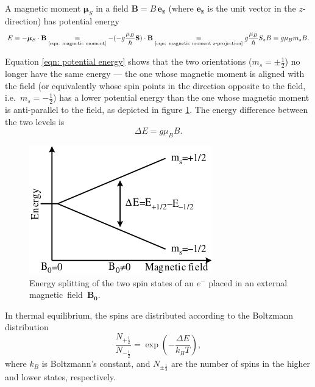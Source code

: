 \documentclass[a4paper]{jpconf}
\numberwithin{equation}{section}
\begin{document}
A magnetic moment $\bm{\mu}_S$ in a field $\mathbf{B} = B \, \mathbf{e_z}$ (where $\mathbf{e_z}$ is the unit vector in the $z$-direction) has potential energy
\begin{equation}
	E = - \bm{\mu}_S \cdot \mathbf{B} \underset{\text{\eqref{eqn: magnetic moment}}}{=}  - (- g \frac{\mu_B}{\hbar} \mathbf{S})\cdot\mathbf{B}
	  \underset{\text{\eqref{eqn: magnetic moment z-projection}}}{=} g \frac{\mu_B}{\hbar}S_z B 
	  = g\mu_Bm_sB \label{eqn: potential energy}.
\end{equation}

Equation \eqref{eqn: potential energy} shows that the two orientations ($m_s = \pm\tfrac12$) no longer have the same energy --- the one whose magnetic moment is aligned with the field (or equivalently whose spin points in the direction opposite to the field, i.e.\ $m_s = -\tfrac12$) has a lower potential energy than the one whose magnetic moment is anti-parallel to the field, as depicted in figure \ref{fig: energy splitting}. The energy difference between the two levels is 
\begin{equation}
	\Delta E = g \mu_B B. \label{eqn: energy difference}
\end{equation}

\begin{figure}[htbp]
	\includegraphics[scale=0.75]{EPR_splitting.png}
	\hspace{2pc}
	\begin{minipage}[b]{3in}
		\caption{Energy splitting of the two spin states of an $e^-$ placed in an external magnetic~field~$\mathbf{B_0}$.}
		\label{fig: energy splitting}
	\end{minipage}
\end{figure}

In thermal equilibrium, the spins are distributed according to the Boltzmann distribution
\[
    \frac{N_{+\tfrac12}}{N_{-\tfrac12}} = \exp(- \frac{\Delta E}{k_B T}),
\]
where $k_B$ is Boltzmann\textquoteright s constant, and $N_{\pm\tfrac12}$ are the number of spins in the higher and lower states, respectively. 
\end{document}
